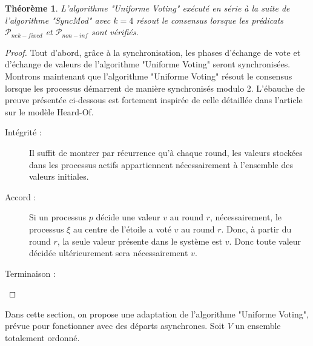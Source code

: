 \documentclass{article}
\newtheorem{theorem}{Théorème}
\begin{document}
\begin{theorem}
	L'algorithme "Uniforme Voting" exécuté en série à la suite de l'algorithme "SyncMod" avec $k = 4$
	résout le consensus lorsque les prédicats $\mathcal{P}_{nek-fixed}$ et $\mathcal{P}_{non-inf}$ sont vérifiés.
\end{theorem}
\begin{proof}
	Tout d'abord, grâce à la synchronisation, les phases d'échange de vote et d'échange de valeurs de l'algorithme "Uniforme Voting" seront synchronisées.
	Montrons maintenant que l'algorithme "Uniforme Voting" résout le consensus lorsque les processus démarrent de manière synchronisés modulo 2.
	L'ébauche de preuve présentée ci-dessous est fortement inspirée de celle détaillée dans l'article sur le modèle Heard-Of.

	\begin{description}
		\item[Intégrité :] Il suffit de montrer par récurrence qu'à chaque round, les valeurs stockées dans les processus actifs appartiennent nécessairement à l'ensemble des valeurs initiales.
		\item[Accord :] Si un processus $p$ décide une valeur $v$ au round $r$, nécessairement, le processus $\xi$ au centre de l'étoile a voté $v$ au round $r$.
			Donc, à partir du round $r$, la seule valeur présente dans le système est $v$. Donc toute valeur décidée ultérieurement sera nécessairement $v$.
		\item[Terminaison :]
	\end{description}
\end{proof}

Dans cette section, on propose une adaptation de l'algorithme  "Uniforme Voting", prévue pour fonctionner avec des départs asynchrones.
Soit $V$ un ensemble totalement ordonné.
\end{document}
